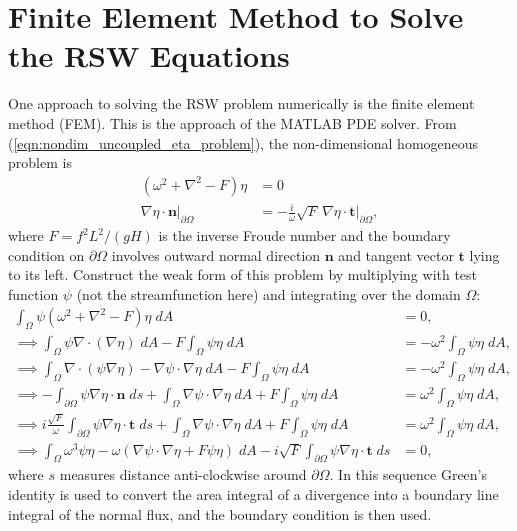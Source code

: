 \documentclass[10pt,reqno]{amsart}
\newcommand{\nn}{{\mathbf n}}
\newcommand{\ttt}{{\mathbf t}}
\begin{document}
\section{Finite Element Method to Solve the RSW Equations}
\label{app:FEM}
One approach to solving the RSW problem numerically is the finite element method (FEM). 
This is the approach of the MATLAB PDE solver.
From (\ref{eqn:nondim_uncoupled_eta_problem}), the non-dimensional homogeneous problem is
\begin{align}
\left( \omega^2 + \nabla^2 - F \right)
\eta & =  0\\
\left. \nabla \eta \cdot \nn \right|_{\partial \Omega} & = -  \frac{i}{\omega} \sqrt{F}\, \nabla \eta \cdot \ttt \left. \right|_{\partial \Omega},
\end{align}
where $F = f^2 L^2 / (g H)$ is the inverse Froude number and the boundary condition on $\partial \Omega$ involves outward normal direction $\nn$ and tangent vector $\ttt$ lying to its left.
Construct the weak form of this problem by multiplying with test function $\psi$ (not the streamfunction here) and integrating over the domain $\Omega$:
\begin{align}
\int_\Omega \psi \left( \omega^2 + \nabla^2 - F \right) \eta \; d A & =  0 , \nonumber \\
\implies 
\int_\Omega \psi  \nabla \cdot \left( \nabla \eta \right)  \; d A - F \int_\Omega \psi \eta \; d A & = - \omega^2 \int_\Omega \psi \eta \; d A , \nonumber \\
\implies 
\int_ \Omega  \nabla \cdot \left( \psi \nabla \eta \right) - \nabla \psi \cdot   \nabla \eta  \; d A - F \int_\Omega \psi \eta \; d A & = - \omega^2 \int_\Omega \psi \eta \; d A , \nonumber \\
\implies 
- \int_ {\partial \Omega}  \psi \nabla \eta \cdot \nn \; d s +  \int_\Omega \nabla \psi \cdot   \nabla \eta  \; d A + F \int_\Omega \psi \eta \; d A & = \omega^2 \int_\Omega \psi \eta \; d A , \nonumber \\
\implies 
i \frac{\sqrt{F}}{\omega} \int_ {\partial \Omega}  \psi \nabla \eta \cdot \ttt \; d s + \int_\Omega \nabla \psi \cdot   \nabla \eta  \; d A + F \int_\Omega \psi \eta \; d A & = \omega^2 \int_\Omega \psi \eta \; d A , \nonumber \\
\implies 
\int_\Omega \omega^3 \psi \eta - \omega \left(  \nabla \psi \cdot   \nabla \eta  + F \psi \eta \right) \; d A - i \sqrt{F} \int_ {\partial \Omega}  \psi \nabla \eta \cdot \ttt \; d s & = 0 , 
\end{align}
where $s$ measures distance anti-clockwise around $\partial \Omega$.
In this sequence Green's identity is used to convert the area integral of a divergence into a boundary line integral of the normal flux, and the boundary condition is then used.
\end{document}
